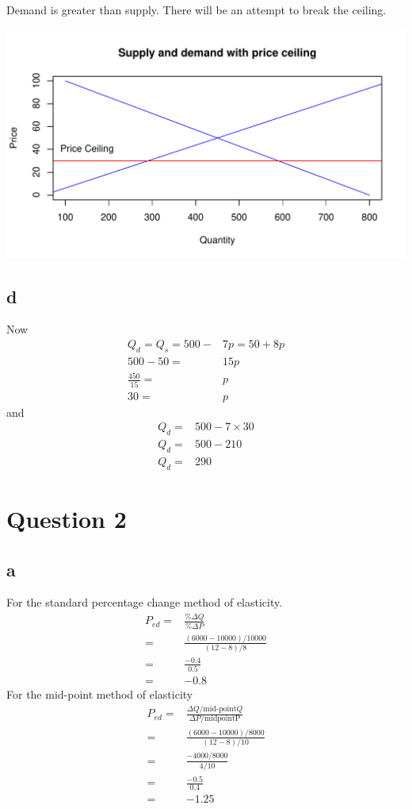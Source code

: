 \documentclass[12pt, a4paper, oneside]{article}\usepackage[]{graphicx}\usepackage[]{color}
\makeatletter
\def\maxwidth{ %
  \ifdim\Gin@nat@width>\linewidth
    \linewidth
  \else
    \Gin@nat@width
  \fi
}
\newenvironment{knitrout}{}{} %
\makeatother
\begin{document}
Demand is greater than supply.  There will be an attempt to break the ceiling.  

\begin{knitrout}
\color{fgcolor}
\includegraphics[width=\maxwidth]{figure/ceiling} 

\end{knitrout}

\subsection*{d}
Now
\begin{align*}
Q_d = Q_s = 500 -& 7p = 50 + 8p\\
500 - 50 =& 15p\\
\frac{450}{15} =& p\\
30 =& p
\end{align*}
and 
\begin{align*}
Q_d =& 500 - 7 \times 30\\
Q_d =& 500 - 210\\
Q_d =& 290
\end{align*}

\section{Question 2}
\subsection*{a}
For the standard percentage change method of elasticity. 
\begin{align*}
P_{ed} =& \frac{\% \Delta Q}{\% \Delta P}\\
=& \frac{(6000-10000)/10000}{(12-8)/8}\\
=& \frac{-0.4}{0.5}\\
=& -0.8
\end{align*}
For the mid-point method of elasticity
\begin{align*}
P_{ed} =& \frac{\Delta Q/\text{mid-point} Q}{\Delta P/ \text{midpoint{P}}}\\
=& \frac{(6000-10000)/8000}{(12-8)/10}\\
=& \frac{-4000/8000}{4/10}\\
=& \frac{-0.5}{0.4}\\
=& -1.25
\end{align*}
\end{document}
